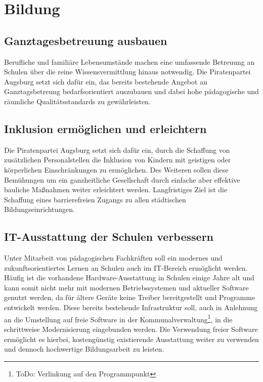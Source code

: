\chapter{Bildung}
  
  \section{Ganztagesbetreuung ausbauen}
  
  Berufliche und familiäre Lebensumstände machen eine umfassende Betreuung an 
  Schulen über die reine Wissensvermittlung hinaus notwendig. Die 
  Piratenpartei Augsburg setzt sich dafür ein, das bereits bestehende Angebot 
  an Ganztagsbetreung bedarfsorientiert auszubauen und dabei hohe pädagogische 
  und räumliche Qualitätsstandards zu gewährleisten.
  
  \section{Inklusion ermöglichen und erleichtern}
  
  Die Piratenpartei Augsburg setzt sich dafür ein, durch die Schaffung von 
  zusätzlichen Personalstellen die Inklusion von Kindern mit geistigen oder 
  körperlichen Einschränkungen zu ermöglichen. Des Weiteren sollen diese 
  Bemühungen um ein ganzheitliche Gesellschaft durch einfache aber effektive 
  bauliche Maßnahmen weiter erleichtert werden. Langfristiges Ziel ist die 
  Schaffung eines barrierefreien Zugangs zu allen städtischen 
  Bildungseinrichtungen.
  
  \section{IT-Ausstattung der Schulen verbessern}
  
  Unter Mitarbeit von pädagogischen Fachkräften soll ein modernes und 
  zukunftsorientiertes Lernen an Schulen auch im IT-Bereich ermöglicht werden. 
  Häufig ist die vorhandene Hardware-Ausstattung in Schulen einige Jahre alt 
  und kann somit nicht mehr mit modernen Betriebssystemen und aktueller 
  Software genutzt werden, da für ältere Geräte keine Treiber bereitgestellt 
  und Programme entwickelt werden. Diese bereits bestehende Infrastruktur 
  soll, auch in Anlehnung an die Umstellung auf freie Software in der 
  Kommunalverwaltung\footnote{ToDo: Verlinkung auf den Programmpunkt}, in die 
  schrittweise Modernisierung eingebunden werden. Die Verwendung freier 
  Software ermöglicht es hierbei, kostengünstig existierende Ausstattung 
  weiter zu verwenden und dennoch hochwertige Bildungsarbeit zu leisten.
  
